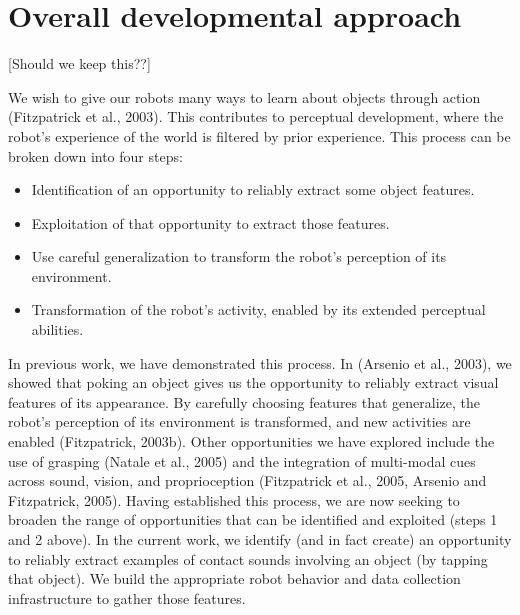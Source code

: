 \section{Overall developmental approach}
 \label{sec:approach}
[Should we keep this??]

 We wish to give our robots many ways to learn about
objects through action (Fitzpatrick et al., 2003). This
contributes to perceptual development, where the robot's
experience of the world is filtered by prior experience. This
process can be broken down into four steps:

\begin{itemize}

\item Identification of an opportunity to reliably extract some
object features.

\item Exploitation of that opportunity to extract those features.

\item Use careful generalization to transform the robot's
perception of its environment.

\item Transformation of the robot's activity, enabled by its
extended perceptual abilities.

\end{itemize}

In previous work, we have demonstrated this process. In (Arsenio
et al., 2003), we showed that poking an object gives us the
opportunity to reliably extract visual features of its appearance.
By carefully choosing features that generalize, the robot's
perception of its environment is transformed, and new activities
are enabled (Fitzpatrick, 2003b). Other opportunities we have
explored include the use of grasping (Natale et al., 2005) and the
integration of multi-modal cues across sound, vision, and
proprioception (Fitzpatrick et al., 2005, Arsenio and Fitzpatrick,
2005). Having established this process, we are now seeking to
broaden the range of opportunities that can be identified and
exploited (steps 1 and 2 above). In the current work, we identify
(and in fact create) an opportunity to reliably extract examples
of contact sounds involving an object (by tapping that object). We
build the appropriate robot behavior and data collection
infrastructure to gather those features.
